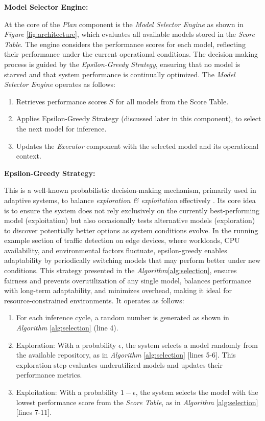 \noindent
\textbf{Model Selector Engine:}

At the core of the \textit{Plan} component is the \textit{Model Selector Engine} as shown in \textit{Figure} \ref{fig:architecture}, which evaluates all available models stored in the \textit{Score Table}. The engine considers the performance scores for each model, reflecting their performance under the current operational conditions. The decision-making process is guided by the \textit{Epsilon-Greedy Strategy}, ensuring that no model is starved and that system performance is continually optimized. The \textit{Model Selector Engine} operates as follows:

\begin{enumerate}
    \item Retrieves performance scores \(S\) for all models from the Score Table.
    \item Applies Epsilon-Greedy Strategy (discussed later in this component), to select the next model for inference.
    \item Updates the \textit{Executor} component with the selected model and its operational context. 
\end{enumerate}

\noindent
\textbf{Epsilon-Greedy Strategy:}

This is a well-known probabilistic decision-making mechanism, primarily used in adaptive systems, to balance \textit{exploration \& exploitation} effectively \cite{b38}\cite{b39}. Its core idea is to ensure the system does not rely exclusively on the currently best-performing model (exploitation) but also occasionally tests alternative models (exploration) to discover potentially better options as system conditions evolve. In the running example section of traffic detection on edge devices, where workloads, CPU availability, and environmental factors fluctuate, epsilon-greedy enables adaptability by periodically switching models that may perform better under new conditions. This strategy presented in the \textit{Algorithm}\ref{alg:selection}, ensures fairness and prevents overutilization of any single model, balances performance with long-term adaptability, and minimizes overhead, making it ideal for resource-constrained environments. It operates as follows: 

\begin{enumerate}
    \item For each inference cycle, a random number is generated as shown in \textit{Algorithm} \ref{alg:selection} (line 4).
    \item Exploration: With a probability \(\epsilon\), the system selects a model randomly from the available repository, as in \textit{Algorithm} \ref{alg:selection} [lines 5-6]. This exploration step evaluates underutilized models and updates their performance metrics. 
    \item Exploitation: With a probability \(1-\epsilon\), the system selects the model with the lowest performance score from the \textit{Score Table}, as in \textit{Algorithm} \ref{alg:selection} [lines 7-11].
\end{enumerate}

